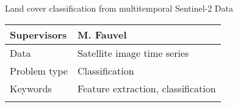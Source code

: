 \documentclass[pressentation,10pt,aspectratio=1610, xcolor=table]{beamer}
\begin{document}
\begin{frame}[label={sec:org00dd2e0}]{Land cover classification from multitemporal Sentinel-2 Data}
\begin{center}
\begin{tabular}{ll}
\toprule
Supervisors & M. Fauvel\\
\midrule
Data & Satellite image time series\\
\midrule
Problem type & Classification\\
\midrule
Keywords & Feature extraction, classification\\
 & \\
\bottomrule
\end{tabular}
\end{center}
\end{frame}
\end{document}
